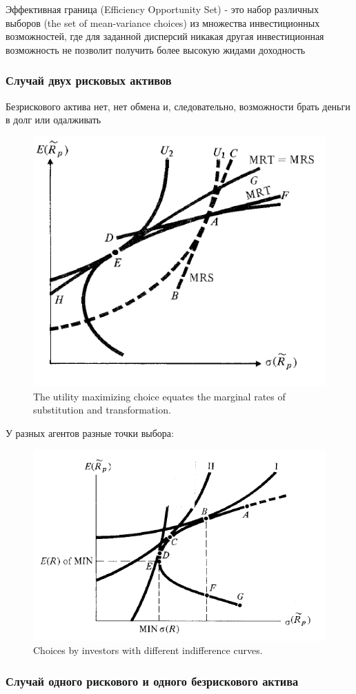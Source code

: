 \documentclass[a4paper,12pt]{article} %
\begin{document}
  Эффективная граница (Efficiency Opportunity Set) -  это набор различных выборов (the set of mean-variance choices) из множества инвестиционных возможностей, где для заданной дисперсий никакая другая инвестиционная возможность не позволит получить более высокую жидами доходность
   
   \subsubsection{Случай двух рисковых активов}
   
   Безрискового актива нет, нет обмена и, следовательно,  возможности
  брать деньги в долг или одалживать 
  
   \begin{figure}[h!]
   	\centering
   	\includegraphics[width=0.5\linewidth]{screenshot009}
   	\caption{The utility maximizing choice equates the marginal rates of substitution and transformation.}
   	\label{fig:screenshot009}
   	
   	
   \end{figure}
   
   
   У разных агентов  разные точки выбора: 
   
   
\begin{figure}[h!]
	\centering
	\includegraphics[width=0.5\linewidth]{screenshot010}
	\caption{Choices by investors with different indifference curves.}
	\label{fig:screenshot010}
\end{figure}
   
    \subsubsection{Случай одного рискового и одного безрискового актива
    }
\end{document}
